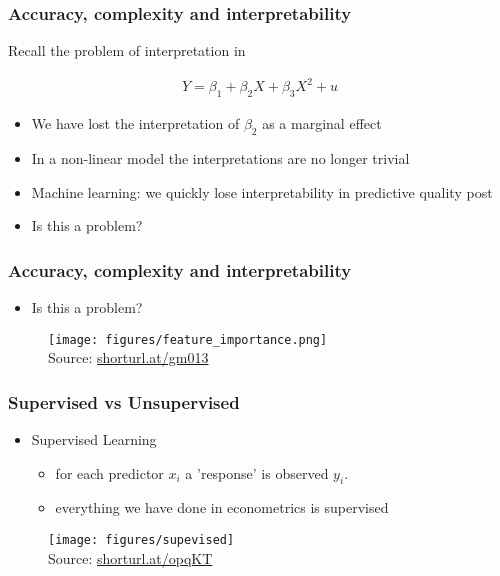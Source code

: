 \documentclass[
  shownotes,
  xcolor={svgnames},
  hyperref={colorlinks,citecolor=DarkBlue,linkcolor=DarkRed,urlcolor=DarkBlue}
  ]{beamer}
\begin{document}
\begin{frame}
\frametitle{Accuracy, complexity and interpretability}

Recall the problem of interpretation in

\begin{align}
Y=\beta_1+\beta_2 X+\beta_3 X^2+u
\end{align}

\begin{itemize}
  \item We have lost the interpretation of $\beta_2$ as a marginal effect
  \item In a non-linear model the interpretations are no longer trivial
  \item Machine learning: we quickly lose interpretability in predictive quality post
  \item Is this a problem?
\end{itemize}
\end{frame}

\begin{frame}
\frametitle{Accuracy, complexity and interpretability}

\begin{itemize}
  \item Is this a problem?
\end{itemize}

\bigskip

\begin{figure}[H] \centering
  \centering
  \texttt{[image: figures/feature\_importance.png]}
  \\
  \tiny
  Source: \url{shorturl.at/gm013}
  \end{figure}

\end{frame}


\begin{frame}
\frametitle{Supervised vs Unsupervised}


\begin{itemize}
  \item Supervised Learning 
  \begin{itemize}
    \item for each predictor $x_i$ a 'response' is observed $y_i$.
    \item everything we have done in econometrics is supervised
  \end{itemize}
\end{itemize}

\bigskip
\begin{figure}[H] \centering
  \captionsetup{justification=centering}
  
    \centering
    \texttt{[image: figures/supevised]}
  \\
  \tiny
  Source: \url{shorturl.at/opqKT}
  \end{figure}
  
\end{frame}
\end{document}
